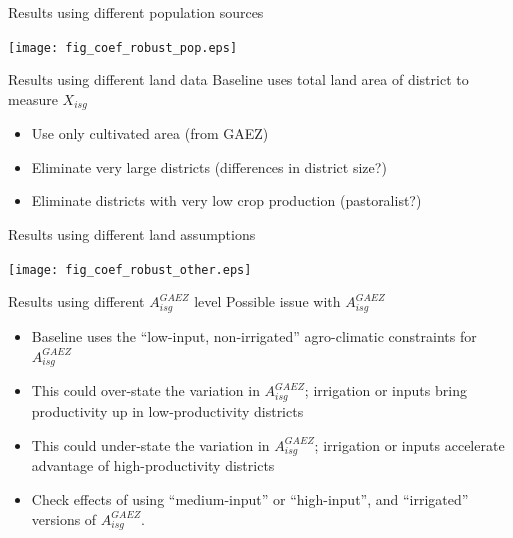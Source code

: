 \documentclass[10pt, xcolor=dvipsnames]{beamer}
\begin{document}
\begin{frame}{Results using different population sources}\label{pop}
\begin{center}
\texttt{[image: fig\_coef\_robust\_pop.eps]}
\end{center}
\hfill \hyperlink{popreg}{}
\end{frame}

\begin{frame}{Results using different land data}
Baseline uses total land area of district to measure $X_{isg}$

\begin{itemize}
  \item Use only cultivated area (from GAEZ)
  \item Eliminate very large districts (differences in district size?)
  \item Eliminate districts with very low crop production (pastoralist?)
\end{itemize}

\hfill \hyperlink{cultivated}{}
\end{frame}

\begin{frame}{Results using different land assumptions}\label{land}
\begin{center}
\texttt{[image: fig\_coef\_robust\_other.eps]}
\end{center}
\hfill \hyperlink{landreg}{}
\end{frame}

\begin{frame}{Results using different $A^{GAEZ}_{isg}$ level}
Possible issue with $A^{GAEZ}_{isg}$
\begin{itemize}
  \item Baseline uses the ``low-input, non-irrigated'' agro-climatic constraints for $A^{GAEZ}_{isg}$
  \item This could over-state the variation in $A^{GAEZ}_{isg}$; irrigation or inputs bring productivity up in low-productivity districts
  \item This could under-state the variation in $A^{GAEZ}_{isg}$; irrigation or inputs accelerate advantage of high-productivity districts
  \item Check effects of using ``medium-input'' or ``high-input'', and ``irrigated'' versions of $A^{GAEZ}_{isg}$.
\end{itemize}

\end{frame}
\end{document}
